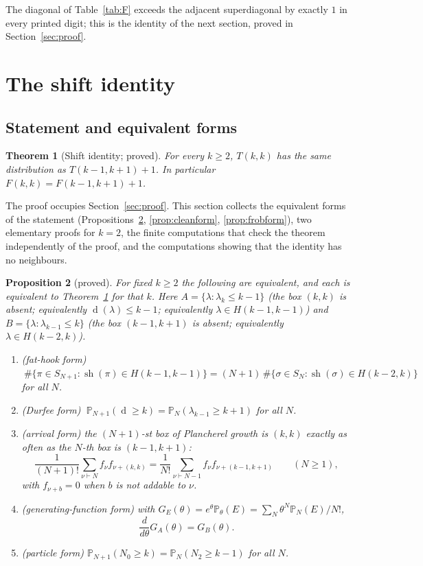 \documentclass[11pt]{article}
\newtheorem{theorem}{Theorem}[section]
\newtheorem{proposition}[theorem]{Proposition}
\theoremstyle{definition}
\theoremstyle{remark}
\newcommand{\Prob}{\mathbb{P}}
\DeclareMathOperator{\sh}{sh}
\DeclareMathOperator{\Durfee}{d}
\begin{document}
The diagonal of Table~\ref{tab:F} exceeds the adjacent superdiagonal by exactly $1$ in every printed digit; this is the identity of the next section, proved in Section~\ref{sec:proof}.

\section{The shift identity}\label{sec:identity}

\subsection{Statement and equivalent forms}

\begin{theorem}[Shift identity; proved]\label{thm:main}
For every $k\ge2$, $T(k,k)$ has the same distribution as $T(k-1,k+1)+1$. In particular $F(k,k)=F(k-1,k+1)+1$.
\end{theorem}

The proof occupies Section~\ref{sec:proof}. This section collects the equivalent forms of the statement (Propositions~\ref{prop:equiv}, \ref{prop:cleanform}, \ref{prop:frobform}), two elementary proofs for $k=2$, the finite computations that check the theorem independently of the proof, and the computations showing that the identity has no neighbours.

\begin{proposition}[proved]\label{prop:equiv}
For fixed $k\ge2$ the following are equivalent, and each is equivalent to Theorem~\ref{thm:main} for that $k$. Here $A=\{\lambda:\lambda_k\le k-1\}$ (the box $(k,k)$ is absent; equivalently $\Durfee(\lambda)\le k-1$; equivalently $\lambda\in H(k-1,k-1)$) and $B=\{\lambda:\lambda_{k-1}\le k\}$ (the box $(k-1,k+1)$ is absent; equivalently $\lambda\in H(k-2,k)$).
\begin{enumerate}[label=(\alph*)]
\item (fat-hook form) $\ \#\{\pi\in S_{N+1}:\sh(\pi)\in H(k-1,k-1)\}=(N+1)\,\#\{\sigma\in S_N:\sh(\sigma)\in H(k-2,k)\}$ for all $N$.
\item (Durfee form) $\ \Prob_{N+1}(\Durfee\ge k)=\Prob_N(\lambda_{k-1}\ge k+1)$ for all $N$.
\item (arrival form) the $(N+1)$-st box of Plancherel growth is $(k,k)$ exactly as often as the $N$-th box is $(k-1,k+1)$:
\[
\frac1{(N+1)!}\sum_{\nu\vdash N}f_\nu f_{\nu+(k,k)}=\frac1{N!}\sum_{\nu\vdash N-1}f_\nu f_{\nu+(k-1,k+1)}\qquad(N\ge1),
\]
with $f_{\nu+b}=0$ when $b$ is not addable to $\nu$.
\item (generating-function form) with $G_E(\theta)=e^\theta\Prob_\theta(E)=\sum_N\theta^N\Prob_N(E)/N!$,
\[
\frac{d}{d\theta}G_A(\theta)=G_B(\theta).
\]
\item (particle form) $\Prob_{N+1}(N_0\ge k)=\Prob_N(N_2\ge k-1)$ for all $N$.
\end{enumerate}
\end{proposition}
\end{document}
